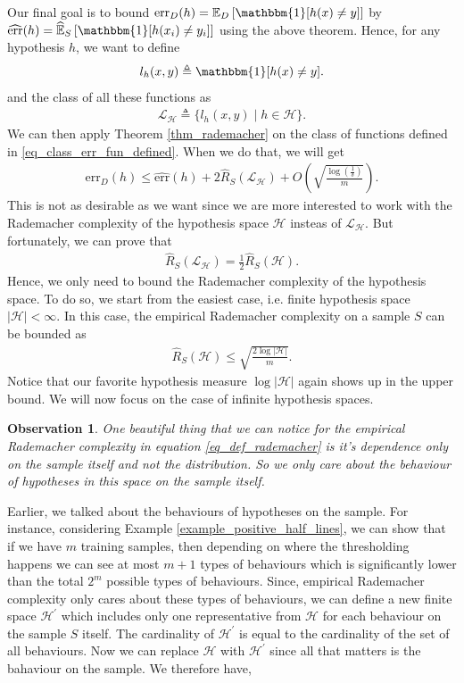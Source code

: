 \documentclass[10pt ]{article}
\newtheorem{obs}{Observation}
\begin{document}
Our final goal is to bound $\mathrm{err}_D (h) =\mathbb{E}_D \left[ \mathbbm{1} [h(x) \neq y] \right] $ by  $\widehat{\mathrm{err}}(h)=\widehat{\mathbb{E}}_S \left[ \mathbbm{1} [h(x_i) \neq y_i] \right] $ using the above theorem. Hence, for any hypothesis $h$, we want to define 
\begin{align}
l_h(x,y)\triangleq\mathbbm{1} [h(x) \neq y].
\end{align}
and the class of all these functions as 
\begin{align}
\mathcal{L}_{\mathcal{H}} \triangleq  \{l_h(x,y) \mid h \in \mathcal{H} \}.
\label{eq_class_err_fun_defined}
\end{align}
We can then apply Theorem \ref{thm_rademacher} on the class of functions defined in \eqref{eq_class_err_fun_defined}. When we do that, we will get
\begin{align}
\mathrm{err}_D (h)  \le \widehat{\mathrm{err}}(h) + 2 \widehat{R}_S({\mathcal{L}_{\mathcal{H}} }) + O \left(\sqrt{\frac{\log(\frac{1}{\delta})}{m}} \right).
\end{align}
This is not as desirable as we want since we are more interested to work with the Rademacher complexity of the hypothesis space $\mathcal{H}$ insteas of $\mathcal{L}_{\mathcal{H}} $. But fortunately, we can prove that 
\begin{align}
 \widehat{R}_S({\mathcal{L}_{\mathcal{H}} }) = \frac{1}{2} \widehat{R}_S({\mathcal{H}}).
\end{align}
Hence, we only need to bound the Rademacher complexity of the hypothesis space. To do so, we start from the easiest case, i.e. finite hypothesis space $|\mathcal{H}|<\infty$. In this case, the empirical Rademacher complexity on a sample $S$ can be bounded as 
\begin{align}
\widehat{R}_S({\mathcal{H}}) \le \sqrt{\frac{2 \log |\mathcal{H}|}{m}}.
\end{align}
Notice that our favorite hypothesis measure $\log |\mathcal{H}|$
again shows up in the upper bound. We will now focus on the case of infinite hypothesis spaces. 
\begin{obs}{\em 
One beautiful thing that we can notice for the empirical Rademacher complexity in equation \eqref{eq_def_rademacher} is it's dependence only on the sample itself and not the distribution. So we only care about the \emph{behaviour} of hypotheses in this space on the sample itself. 
}
\end{obs}
Earlier, we talked about the behaviours of hypotheses on the sample. For instance, considering Example \ref{example_positive_half_lines}, we can show that if we have $m$ training samples, then depending on where the thresholding happens we can see at most $m+1$ types of behaviours which is significantly lower than the total $2^m$ possible types of behaviours. Since, empirical Rademacher complexity only cares about these types of behaviours, we can define a new finite space $\mathcal{H}^{\prime}$ which includes only one representative from $\mathcal{H}$ for each behaviour on the sample $S$ itself. The cardinality of $\mathcal{H}^{\prime}$ is equal to the cardinality of the set of all behaviours. Now we can replace $\mathcal{H}$ with $\mathcal{H}^{\prime}$ since all that matters is the bahaviour on the sample. We therefore have, 
\end{document}
